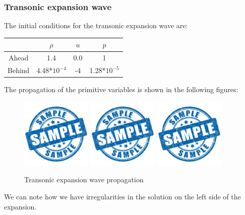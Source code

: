 \documentclass{report}
\begin{document}
\subsubsection{Transonic expansion wave}
The initial conditions for the transonic expansion wave are:\\
\begin{table}[H]
    \centering
    \begin{tabular}{|c|c|c|c|}
        \hline
        & $\rho$ & $u$ & $p$ \\
        \hline
        Ahead & 1.4 & 0.0 & 1 \\
        Behind & 4.48*$10^{-4}$ & -4 & 1.28*$10^{-5}$\\ 
        \hline
    \end{tabular}
\end{table}
The propagation of the primitive variables is shown in the following figures:
\begin{figure}[H]
    \centering
    \includegraphics[width=0.3\textwidth]{Images/sample.jpg}
    \includegraphics[width=0.3\textwidth]{Images/sample.jpg}
    \includegraphics[width=0.3\textwidth]{Images/sample.jpg}
    \caption{Transonic expansion wave propagation}
    \label{fig:transonic_expansion_wave_results}
\end{figure}
We can note how we have irregularities in the solution on the left side of the expansion.
\end{document}
